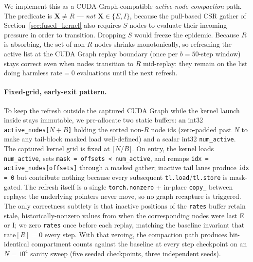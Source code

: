 \documentclass[a4paper,fleqn]{cas-sc}
\theoremstyle{definition}
\theoremstyle{remark}
\begin{document}
We implement this as a CUDA-Graph-compatible \emph{active-node compaction} path. The predicate is $\mathbf{X} \ne R$ --- \emph{not} $\mathbf{X} \in \{E, I\}$, because the pull-based CSR gather of Section~\ref{sec:fused_kernel} also requires $S$ nodes to evaluate their incoming pressure in order to transition. Dropping $S$ would freeze the epidemic. Because $R$ is absorbing, the set of non-$R$ nodes shrinks monotonically, so refreshing the active list at the CUDA Graph replay boundary (once per $b=50$-step window) stays correct even when nodes transition to $R$ mid-replay: they remain on the list doing harmless $\mathrm{rate}=0$ evaluations until the next refresh.

\paragraph{Fixed-grid, early-exit pattern.}
To keep the refresh outside the captured CUDA Graph while the kernel launch inside stays immutable, we pre-allocate two static buffers: an int32 \texttt{active\_nodes[$N{+}B$]} holding the sorted non-$R$ node ids (zero-padded past $N$ to make any tail-block masked load well-defined) and a scalar int32 \texttt{num\_active}. The captured kernel grid is fixed at $\lceil N/B \rceil$. On entry, the kernel loads \texttt{num\_active}, sets \texttt{mask = offsets < num\_active}, and remaps \texttt{idx = active\_nodes[offsets]} through a masked gather; inactive tail lanes produce \texttt{idx = 0} but contribute nothing because every subsequent \texttt{tl.load}/\texttt{tl.store} is mask-gated. The refresh itself is a single \texttt{torch.nonzero} + in-place \texttt{copy\_} between replays; the underlying pointers never move, so no graph recapture is triggered. The only correctness subtlety is that inactive positions of the \texttt{rates} buffer retain stale, historically-nonzero values from when the corresponding nodes were last E or I; we zero \texttt{rates} once before each replay, matching the baseline invariant that $\mathrm{rate}[R] = 0$ every step. With that zeroing, the compaction path produces bit-identical compartment counts against the baseline at every step checkpoint on an $N=10^4$ sanity sweep (five seeded checkpoints, three independent seeds).
\end{document}
